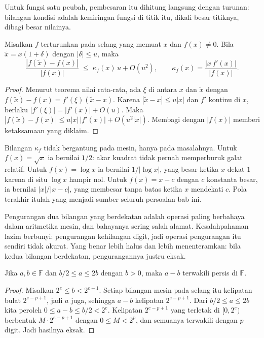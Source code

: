 Untuk fungsi satu peubah, pembesaran itu dihitung langsung dengan turunan: bilangan
kondisi adalah kemiringan fungsi di titik itu, dikali besar titiknya, dibagi besar
nilainya.

\begin{teorema}
Misalkan $f$ terturunkan pada selang yang memuat $x$ dan $f(x)\neq0$. Bila
$\tilde{x}=x(1+\delta)$ dengan $|\delta|\le u$, maka
\[
  \frac{|f(\tilde{x})-f(x)|}{|f(x)|}\;\le\;\kappa_{f}(x)\,u+O(u^{2}),
  \qquad \kappa_{f}(x)=\frac{|x\,f'(x)|}{|f(x)|}.
\]
\end{teorema}

\begin{proof}
Menurut teorema nilai rata-rata, ada $\xi$ di antara $x$ dan $\tilde{x}$ dengan
$f(\tilde{x})-f(x)=f'(\xi)(\tilde{x}-x)$. Karena $|\tilde{x}-x|\le u|x|$ dan $f'$
kontinu di $x$, berlaku $|f'(\xi)|=|f'(x)|+O(u)$. Maka
$|f(\tilde{x})-f(x)|\le u|x|\,|f'(x)|+O(u^{2}|x|)$. Membagi dengan $|f(x)|$ memberi
ketaksamaan yang diklaim.
\end{proof}

Bilangan $\kappa_{f}$ tidak bergantung pada mesin, hanya pada masalahnya. Untuk
$f(x)=\sqrt{x}$ ia bernilai $1/2$: akar kuadrat tidak pernah memperburuk galat relatif.
Untuk $f(x)=\log x$ ia bernilai $1/|\log x|$, yang besar ketika $x$ dekat $1$ karena
di situ $\log x$ hampir nol. Untuk $f(x)=x-c$ dengan $c$ konstanta besar, ia bernilai
$|x|/|x-c|$, yang membesar tanpa batas ketika $x$ mendekati $c$. Pola terakhir itulah
yang menjadi sumber seluruh persoalan bab ini.

Pengurangan dua bilangan yang berdekatan adalah operasi paling berbahaya dalam
aritmetika mesin, dan bahayanya sering salah alamat. Kesalahpahaman lazim berbunyi:
pengurangan kehilangan digit, jadi operasi pengurangan itu sendiri tidak akurat. Yang
benar lebih halus dan lebih menenteramkan: bila kedua bilangan berdekatan,
pengurangannya justru eksak.

\begin{teorema}[Sterbenz]
Jika $a,b\in\mathbb{F}$ dan $b/2\le a\le2b$ dengan $b>0$, maka $a-b$ terwakili persis
di $\mathbb{F}$.
\end{teorema}

\begin{proof}
Misalkan $2^{e}\le b<2^{e+1}$. Setiap bilangan mesin pada selang itu kelipatan bulat
$2^{e-p+1}$, jadi $a$ juga, sehingga $a-b$ kelipatan $2^{e-p+1}$. Dari
$b/2\le a\le2b$ kita peroleh $0\le a-b\le b/2<2^{e}$. Kelipatan $2^{e-p+1}$ yang
terletak di $[0,2^{e})$ berbentuk $M\cdot2^{e-p+1}$ dengan $0\le M<2^{p}$, dan
semuanya terwakili dengan $p$ digit. Jadi hasilnya eksak.
\end{proof}

